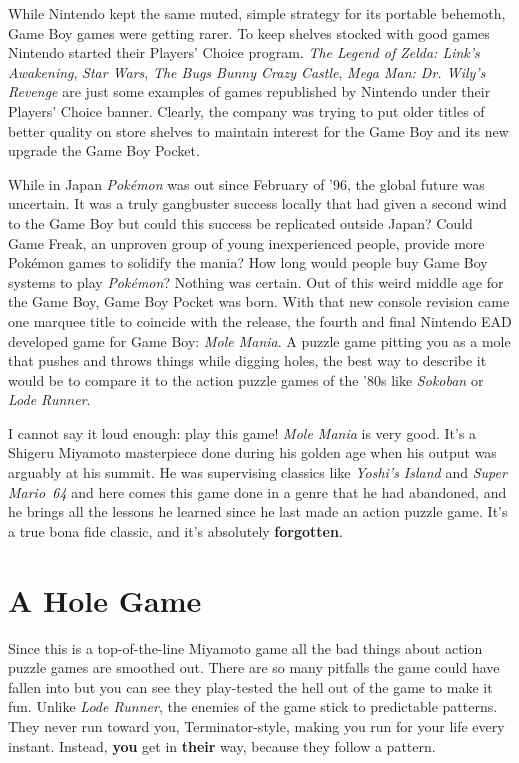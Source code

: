\documentclass{book}
\begin{document}
While Nintendo kept the same muted, simple strategy for its portable behemoth, Game Boy games were getting rarer. To keep shelves stocked with good games Nintendo started their Players’ Choice program. \emph{The Legend of Zelda: Link’s Awakening}, \emph{Star Wars}, \emph{The Bugs Bunny Crazy Castle}, \emph{Mega Man: Dr. Wily’s Revenge} are just some examples of games republished by Nintendo under their Players’ Choice banner. Clearly, the company was trying to put older titles of better quality on store shelves to maintain interest for the Game Boy and its new upgrade the Game Boy Pocket.\par
While in Japan \emph{Pokémon} was out since February of ’96, the global future was uncertain. It was a truly gangbuster success locally that had given a second wind to the Game Boy but could this success be replicated outside Japan? Could Game Freak, an unproven group of young inexperienced people, provide more Pokémon games to solidify the mania? How long would people buy Game Boy systems to play \emph{Pokémon}? Nothing was certain. Out of this weird middle age for the Game Boy, Game Boy Pocket was born. With that new console revision came one marquee title to coincide with the release, the fourth and final Nintendo EAD developed game for Game Boy: \emph{Mole Mania}. A puzzle game pitting you as a mole that pushes and throws things while digging holes, the best way to describe it would be to compare it to the action puzzle games of the ’80s like \emph{Sokoban} or \emph{Lode Runner}.\par
I cannot say it loud enough: play this game! \emph{Mole Mania} is very good. It’s a Shigeru Miyamoto masterpiece done during his golden age when his output was arguably at his summit. He was supervising classics like \emph{Yoshi’s Island} and \emph{Super Mario~64} and here comes this game done in a genre that he had abandoned, and he brings all the lessons he learned since he last made an action puzzle game. It’s a true bona fide classic, and it’s absolutely \textbf{forgotten}.\par
\FloatBarrier\section*{A Hole Game}
Since this is a top-of-the-line Miyamoto game all the bad things about action puzzle games are smoothed out. There are so many pitfalls the game could have fallen into but you can see they play-tested the hell out of the game to make it fun. Unlike \emph{Lode Runner}, the enemies of the game stick to predictable patterns. They never run toward you, Terminator-style, making you run for your life every instant. Instead, \textbf{you} get in \textbf{their} way, because they follow a pattern.\par
\end{document}
